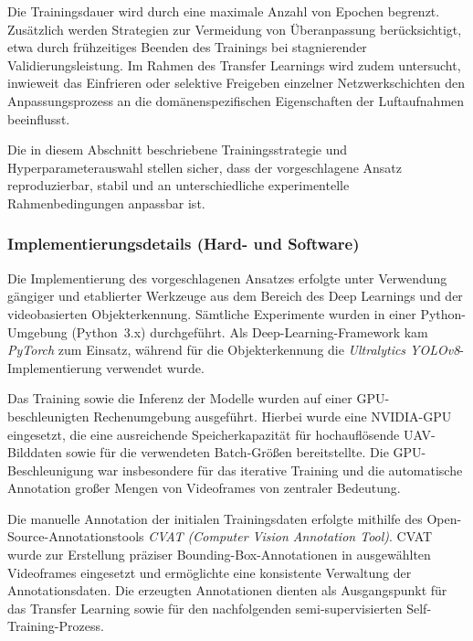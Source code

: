 Die Trainingsdauer wird durch eine maximale Anzahl von Epochen begrenzt. Zusätzlich
werden Strategien zur Vermeidung von Überanpassung berücksichtigt, etwa durch
frühzeitiges Beenden des Trainings bei stagnierender Validierungsleistung. Im Rahmen
des Transfer Learnings wird zudem untersucht, inwieweit das Einfrieren oder selektive
Freigeben einzelner Netzwerkschichten den Anpassungsprozess an die domänenspezifischen
Eigenschaften der Luftaufnahmen beeinflusst.

Die in diesem Abschnitt beschriebene Trainingsstrategie und Hyperparameterauswahl
stellen sicher, dass der vorgeschlagene Ansatz reproduzierbar, stabil und an
unterschiedliche experimentelle Rahmenbedingungen anpassbar ist.

\subsubsection{Implementierungsdetails (Hard- und Software)}

Die Implementierung des vorgeschlagenen Ansatzes erfolgte unter Verwendung gängiger
und etablierter Werkzeuge aus dem Bereich des Deep Learnings und der
videobasierten Objekterkennung. Sämtliche Experimente wurden in einer
Python-Umgebung (Python~3.x) durchgeführt. Als Deep-Learning-Framework kam
\textit{PyTorch} zum Einsatz, während für die Objekterkennung die
\textit{Ultralytics YOLOv8}-Implementierung verwendet wurde.

Das Training sowie die Inferenz der Modelle wurden auf einer GPU-beschleunigten
Rechenumgebung ausgeführt. Hierbei wurde eine NVIDIA-GPU eingesetzt, die eine
ausreichende Speicherkapazität für hochauflösende UAV-Bilddaten sowie für die
verwendeten Batch-Größen bereitstellte. Die GPU-Beschleunigung war insbesondere
für das iterative Training und die automatische Annotation großer Mengen von
Videoframes von zentraler Bedeutung.

Die manuelle Annotation der initialen Trainingsdaten erfolgte mithilfe des
Open-Source-Annotationstools \textit{CVAT (Computer Vision Annotation Tool)}.
CVAT wurde zur Erstellung präziser Bounding-Box-Annotationen in ausgewählten
Videoframes eingesetzt und ermöglichte eine konsistente Verwaltung der
Annotationsdaten. Die erzeugten Annotationen dienten als Ausgangspunkt für das
Transfer Learning sowie für den nachfolgenden semi-supervisierten
Self-Training-Prozess.

